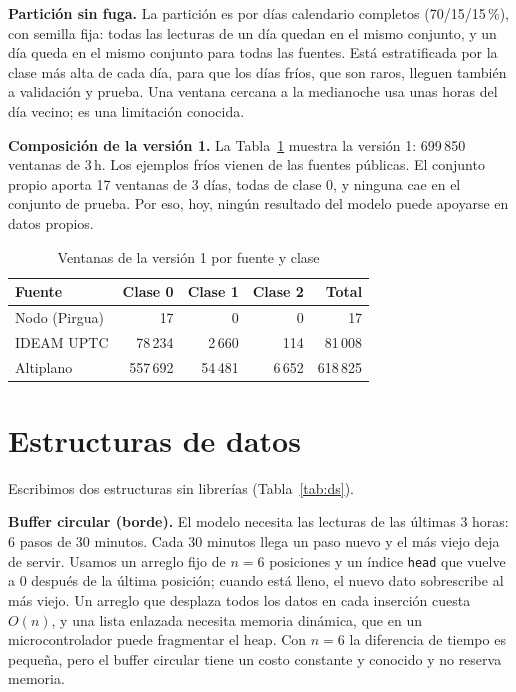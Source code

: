 \documentclass[conference]{IEEEtran}
\begin{document}
\textbf{Partici\'on sin fuga.} La partici\'on es por d\'ias calendario completos (70/15/15\,\%), con semilla fija: todas las lecturas de un d\'ia quedan en el mismo conjunto, y un d\'ia queda en el mismo conjunto para todas las fuentes. Est\'a estratificada por la clase m\'as alta de cada d\'ia, para que los d\'ias fr\'ios, que son raros, lleguen tambi\'en a validaci\'on y prueba. Una ventana cercana a la medianoche usa unas horas del d\'ia vecino; es una limitaci\'on conocida.

\textbf{Composici\'on de la versi\'on 1.} La Tabla~\ref{tab:v1} muestra la versi\'on 1: 699\,850 ventanas de 3\,h. Los ejemplos fr\'ios vienen de las fuentes p\'ublicas. El conjunto propio aporta 17 ventanas de 3 d\'ias, todas de clase 0, y ninguna cae en el conjunto de prueba. Por eso, hoy, ning\'un resultado del modelo puede apoyarse en datos propios.

\begin{table}[t]
\caption{Ventanas de la versi\'on 1 por fuente y clase}
\label{tab:v1}
\centering
\begin{tabular}{@{}lrrrr@{}}
\toprule
Fuente & Clase 0 & Clase 1 & Clase 2 & Total \\
\midrule
Nodo (Pirgua) & 17 & 0 & 0 & 17 \\
IDEAM UPTC & 78\,234 & 2\,660 & 114 & 81\,008 \\
Altiplano & 557\,692 & 54\,481 & 6\,652 & 618\,825 \\
\bottomrule
\end{tabular}
\end{table}

\section{Estructuras de datos}
Escribimos dos estructuras sin librer\'ias (Tabla~\ref{tab:ds}).

\textbf{Buffer circular (borde).} El modelo necesita las lecturas de las \'ultimas 3 horas: 6 pasos de 30 minutos. Cada 30 minutos llega un paso nuevo y el m\'as viejo deja de servir. Usamos un arreglo fijo de $n=6$ posiciones y un \'indice \texttt{head} que vuelve a 0 despu\'es de la \'ultima posici\'on; cuando est\'a lleno, el nuevo dato sobrescribe al m\'as viejo. Un arreglo que desplaza todos los datos en cada inserci\'on cuesta $O(n)$, y una lista enlazada necesita memoria din\'amica, que en un microcontrolador puede fragmentar el heap. Con $n=6$ la diferencia de tiempo es peque\~na, pero el buffer circular tiene un costo constante y conocido y no reserva memoria.
\end{document}
